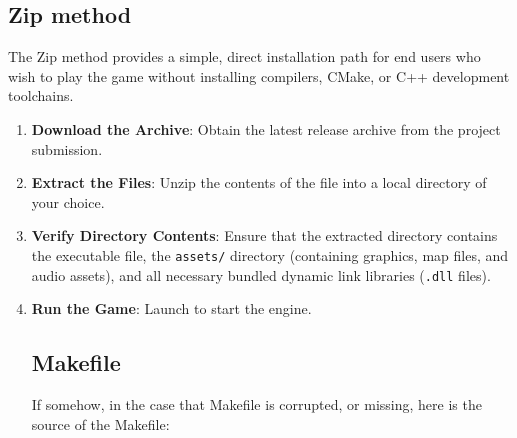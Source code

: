 \documentclass[12pt, a4paper]{article}
\begin{document}
\subsection{Zip method}

The Zip method provides a simple, direct installation path for end users who wish to play the game without installing compilers, CMake, or C++ development toolchains.

\begin{enumerate}
\item \textbf{Download the Archive}: Obtain the latest release archive from the project submission.

\item \textbf{Extract the Files}: Unzip the contents of the file into a local directory of your choice.

\item \textbf{Verify Directory Contents}: Ensure that the extracted directory contains the executable file, the \texttt{assets/} directory (containing graphics, map files, and audio assets), and all necessary bundled dynamic link libraries (\texttt{.dll} files).

\item \textbf{Run the Game}: Launch to start the engine.

\subsection{Makefile}

If somehow, in the case that Makefile is corrupted, or missing, here is the source of the Makefile:


\end{enumerate}
\end{document}
